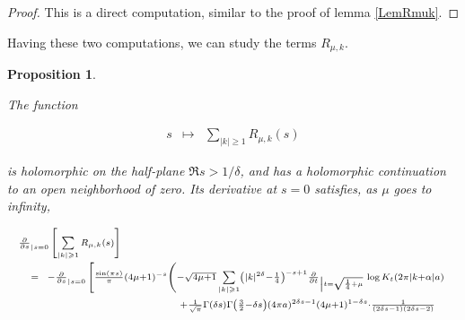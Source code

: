 \documentclass{jams-l}
\newtheorem{proposition}[theorem]{Proposition}
\theoremstyle{definition}
\theoremstyle{remark}
\numberwithin{equation}{section}
\begin{document}
            \begin{proof}
            
                This is a direct computation, similar to the proof of lemma \ref{LemRmuk}.
            
            \end{proof}
            
            Having these two computations, we can study the terms $R_{\mu,k}$.
            
            \begin{proposition}
            \label{PropR}
            
                The function
                
                \[ \begin{array}{lll}
                        s & \longmapsto & \sum\limits_{\left \vert k \right \vert \geqslant 1} R_{\mu,k} \left( s \right)
                    \end{array} \]
                
                \noindent is holomorphic on the half-plane $\Re s > 1/\delta$, and has a holomorphic continuation to an open neighborhood of zero. Its derivative at $s = 0$ satisfies, as $\mu$ goes to infinity,
                
                \[ \begin{array}{lll}
                        \multicolumn{3}{l}{\scriptstyle \frac{\partial}{\partial s}_{\left \vert s = 0 \right.} \left[ \sum\limits_{\left \vert k \right \vert \geqslant 1} R_{\mu,k} \left( s \right) \right]} \\[1em]
                        
                        & \scriptstyle = & \hspace{-3pt} \scriptstyle - \frac{\partial}{\partial s}_{\left \vert s = 0 \right.}  \left[ \frac{\sin \left( \pi s \right)}{\pi} \left( 4 \mu + 1 \right)^{-s} \left( - \sqrt{4 \mu + 1} \sum\limits_{\left \vert k \right \vert \geqslant 1} \left( \left \vert k \right \vert^{2 \delta} - \frac{1}{4} \right)^{- s + 1} \frac{\partial}{\partial t}_{\left \vert t = \sqrt{\frac{1}{4} + \mu} \right.} \log K_t \left( 2 \pi \left \vert k + \alpha \right \vert a \right) \right. \right. \\[1em]
                        
                        && \qquad \qquad \qquad \qquad \qquad \; \scriptstyle + \frac{1}{\sqrt{\pi}} \Gamma \left( \delta s \right) \Gamma \left( \frac{3}{2} - \delta s \right) \left( 4 \pi a \right)^{2 \delta s - 1} \left( 4 \mu + 1 \right)^{1 - \delta s} \cdot \frac{1}{\left( 2 \delta s - 1 \right) \left( 2 \delta s - 2 \right)} \\[1em]
                        

\end{array}\]
\end{proposition}
\end{document}
